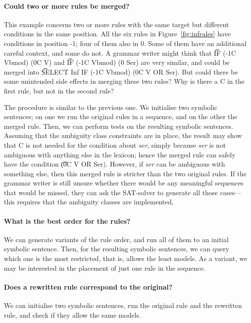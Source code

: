 {{\paragraph{Could two or more rules be merged?} This example concerns two or more rules with the same target but different conditions in the same position. 
All the six rules in Figure~\ref{fig:infrules} have conditions in position -1; four of them also in 0. Some of them have an additional careful context, and some do not.
A grammar writer might think that \t{IF (-1C Vbmod) (0C V)} and \t{IF (-1C Vbmod) (0 Ser)} are very similar, and could be merged into \t{SELECT Inf IF (-1C Vbmod) (0C V OR Ser)}. But could there be some unintended side effects in merging these two rules? Why is there a C in the first rule, but not in the second rule? 

The procedure is similar to the previous one. We initialise two symbolic sentences; on one we run the original rules in a sequence, and on the other the merged rule. 
Then, we can perform tests on the resulting symbolic sentences. Assuming that the ambiguity class constraints are in place, the result may show that C is not needed for the condition about {\em ser}, simply because {\em ser} is not ambiguous with anything else in the lexicon; hence the merged rule can safely have the condition \t{(0C V OR Ser)}. However, if {\em ser} can be ambiguous with something else, then this merged rule is stricter than the two original rules. If the grammar writer is still unsure whether there would be any meaningful sequences that would be missed, they can ask the SAT-solver to generate all those cases---this requires that the ambiguity classes are implemented,  


\paragraph{What is the best order for the rules?}
We can generate variants of the rule order, and run all of them to an initial symbolic sentence. Then, for the resulting symbolic sentences, we can query which one is the most restricted, that is, allows the least models.
As a variant, we may be interested in the placement of just one rule in the sequence.

\paragraph{Does a rewritten rule correspond to the original?}
We can initialise two symbolic sentences, run the original rule and the rewritten rule, and check if they allow the same models. 

}}
